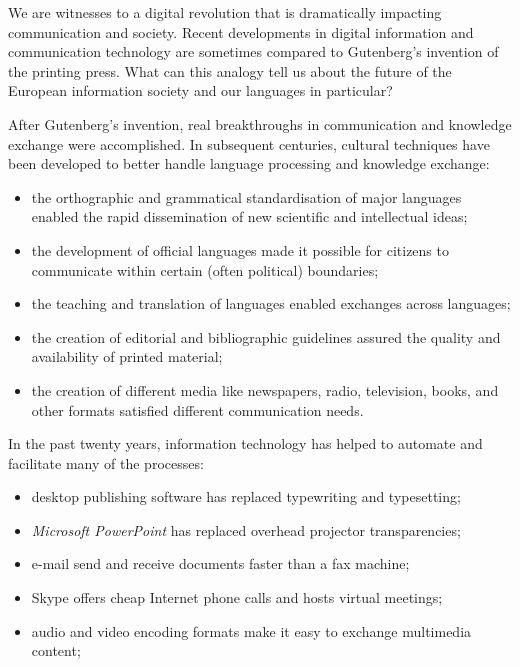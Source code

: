 \begin{multicols}{2}

    We are witnesses to a digital revolution that is dramatically impacting communication and society. Recent developments in digital information and communication technology are sometimes compared to Gutenberg’s invention of the printing press. What can this analogy tell us about the future of the European information society and our languages in particular?


    After Gutenberg’s invention, real breakthroughs in communication and knowledge exchange were accomplished. In subsequent centuries, cultural techniques have been developed to better handle language processing and knowledge exchange:
    \begin{itemize}
      \item the orthographic and grammatical standardisation of major languages enabled the rapid dissemination of new 
      scientific and intellectual ideas;
      \item the development of official languages made it possible for citizens to communicate within certain (often 
      political) boundaries;
      \item the teaching and translation of languages enabled exchanges across languages;
      \item the creation of editorial and bibliographic guidelines assured the quality and availability of printed 
      material;
      \item the creation of different media like newspapers, radio, television, books, and other formats satisfied 
      different communication needs. 
    \end{itemize}
    In the past twenty years, information technology has helped to automate and facilitate many of the processes:
    \begin{itemize}
      \item desktop publishing software has replaced typewriting and typesetting;
      \item \textit{Microsoft PowerPoint} has replaced overhead projector transparencies;
      \item e-mail send and receive documents faster than a fax machine;
      \item Skype offers cheap Internet phone calls and hosts virtual meetings;
      \item audio and video encoding formats make it easy to exchange multimedia content;

\end{itemize}
\end{multicols}
